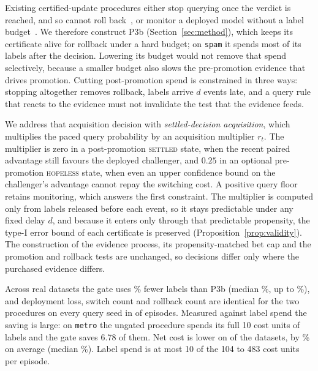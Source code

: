 \documentclass[10pt]{article}
\begin{document}
Existing certified-update procedures either stop querying once the verdict is reached, and so
cannot roll back~\citep{karampatziakis2021offpolicy,balachandran2026discern}, or monitor a
deployed model without a label budget~\citep{podkopaev2022tracking}. We therefore construct
\textsf{P3b} (Section~\ref{sec:method}), which keeps its certificate alive for rollback under a
hard budget; on \texttt{spam} it spends most of its labels after the decision. Lowering its budget
would not remove that spend selectively, because a smaller budget also slows the pre-promotion
evidence that drives promotion. Cutting post-promotion spend is constrained in three ways: stopping
altogether removes rollback, labels arrive $d$ events late, and a query rule that reacts to the
evidence must not invalidate the test that the evidence feeds.

We address that acquisition decision with \emph{settled-decision acquisition}, which multiplies
the paced query probability by an acquisition multiplier $r_t$. The multiplier is zero in a
post-promotion \textsc{settled} state, when the recent paired advantage still favours the deployed
challenger, and $0.25$ in an optional pre-promotion \textsc{hopeless} state, when even an upper
confidence bound on the challenger's advantage cannot repay the switching cost. A positive query
floor retains monitoring, which answers the first constraint. The multiplier is computed only from
labels released before each event, so it stays predictable under any fixed delay $d$, and because
it enters only through that predictable propensity, the type-I error bound of each certificate is
preserved (Proposition~\ref{prop:validity}). The construction of the evidence process, its
propensity-matched bet cap
and the promotion and rollback tests are unchanged, so decisions differ only where the purchased
evidence differs.

Across \NStreams{} real datasets the gate uses \MeanSaving\% fewer labels than \textsf{P3b}
(median \MedSaving\%, up to \MaxSaving\%), and deployment loss, switch count and rollback count are
identical for the two procedures on every query seed in \NSameEpisodes{} of \NEpisodes{} episodes.
Measured against label spend the saving is large: on \texttt{metro} the ungated procedure spends
its full 10 cost units of labels and the gate saves 6.78 of them. Net cost is lower on \NCheaper{}
of the datasets, by \MeanCostChange\% on average (median \MedCostChange\%). Label spend is at
most 10 of the 104 to 483 cost units per episode.
\end{document}
